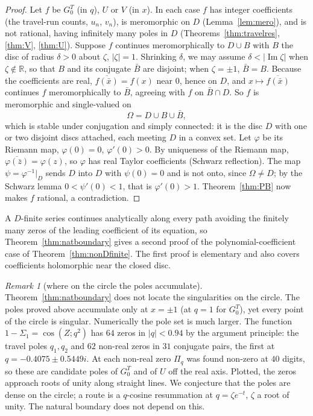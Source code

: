 \documentclass[11pt]{article}
\theoremstyle{plain}
\theoremstyle{definition}
\theoremstyle{remark}
\newtheorem{remark}[theorem]{Remark}
\newcommand{\R}{\mathbb{R}}
\begin{document}
\begin{proof}
Let $f$ be $G^T_0$ (in $q$), $U$ or $V$ (in $x$). In each case $f$ has integer coefficients (the
travel-run counts, $u_n$, $v_n$), is meromorphic on $D$ (Lemma~\ref{lem:mero}), and is not rational,
having infinitely many poles in $D$ (Theorems~\ref{thm:travelres}, \ref{thm:V}, \ref{thm:U}).
Suppose $f$ continues meromorphically to $D\cup B$ with $B$ the disc of radius $\delta>0$ about
$\zeta$, $|\zeta|=1$. Shrinking $\delta$, we may assume $\delta<|\operatorname{Im}\zeta|$ when
$\zeta\notin\R$, so that $B$ and its conjugate $\bar B$ are disjoint; when $\zeta=\pm1$,
$\bar B=B$. Because the coefficients are real, $\overline{f(\bar x)}=f(x)$ near $0$, hence on $D$,
and $x\mapsto\overline{f(\bar x)}$ continues $f$ meromorphically to $\bar B$, agreeing with $f$ on
$\bar B\cap D$. So $f$ is meromorphic and single-valued on
\[
   \Omega=D\cup B\cup\bar B ,
\]
which is stable under conjugation and simply connected: it is the disc $D$ with one or two disjoint
discs attached, each meeting $D$ in a convex set. Let $\varphi$ be its Riemann map, $\varphi(0)=0$,
$\varphi'(0)>0$. By uniqueness of the Riemann map, $\overline{\varphi(\bar z)}=\varphi(z)$, so
$\varphi$ has real Taylor coefficients (Schwarz reflection). The map $\psi=\varphi^{-1}|_D$ sends $D$
into $D$ with $\psi(0)=0$ and is not onto, since $\Omega\ne D$; by the Schwarz lemma
$0<\psi'(0)<1$, that is $\varphi'(0)>1$. Theorem~\ref{thm:PB} now makes $f$ rational, a
contradiction.
\end{proof}

\noindent A $D$-finite series continues analytically along every path avoiding the finitely many
zeros of the leading coefficient of its equation, so Theorem~\ref{thm:natboundary} gives a second
proof of the polynomial-coefficient case of Theorem~\ref{thm:nonDfinite}. The first proof is
elementary and also covers coefficients holomorphic near the closed disc.

\begin{remark}[where on the circle the poles accumulate]\label{rem:polesdensity}
Theorem~\ref{thm:natboundary} does not locate the singularities on the circle. The poles proved
above accumulate only at $x=\pm1$ (at $q=1$ for $G^T_0$), yet every point of the circle is singular.
Numerically the pole set is much larger. The function $1-\Sigma_1=\cos(Z;q^2)$ has $64$ zeros in
$|q|<0.94$ by the argument principle: the travel poles $q_1,q_2$ and $62$ non-real zeros in $31$
conjugate pairs, the first at $q=-0.4075\pm0.5449i$. At each non-real zero $\Pi_q$ was found
non-zero at $40$ digits, so these are candidate poles of $G^T_0$ and of $U$ off the real axis. Plotted,
the zeros approach roots of unity along straight lines. We conjecture that the poles are dense on
the circle; a route is a $q$-cosine resummation at $q=\zeta e^{-t}$, $\zeta$ a root of unity. The
natural boundary does not depend on this.
\end{remark}
\end{document}
